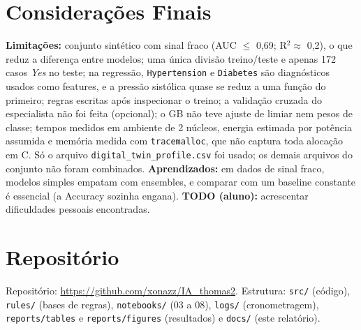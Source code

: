 \documentclass[11pt,a4paper]{article}
\begin{document}
\section{Considerações Finais}
\textbf{Limitações:} conjunto sintético com sinal fraco (AUC $\le$ 0,69; R$^2\approx$ 0,2), o que reduz a diferença entre modelos; uma única divisão treino/teste e apenas 172 casos \emph{Yes} no teste; na regressão, \texttt{Hypertension} e \texttt{Diabetes} são diagnósticos usados como features, e a pressão sistólica quase se reduz a uma função do primeiro;
regras escritas após inspecionar o treino; a validação cruzada do especialista não foi feita (opcional); o GB não teve ajuste de limiar nem pesos de classe; tempos medidos em ambiente de 2 núcleos, energia estimada por potência assumida e memória medida com \texttt{tracemalloc}, que não captura toda alocação em C.
Só o arquivo \texttt{digital\_twin\_profile.csv} foi usado; os demais arquivos do conjunto não foram combinados.
\textbf{Aprendizados:} em dados de sinal fraco, modelos simples empatam com ensembles, e comparar com um baseline constante é essencial (a Accuracy sozinha engana).
\textbf{TODO (aluno):} acrescentar dificuldades pessoais encontradas.

\section{Repositório}
Repositório: \url{https://github.com/xonazz/IA\_thomas2}. Estrutura: \texttt{src/} (código), \texttt{rules/} (bases de regras), \texttt{notebooks/} (03 a 08), \texttt{logs/} (cronometragem),
\texttt{reports/tables} e \texttt{reports/figures} (resultados) e \texttt{docs/} (este relatório).
\end{document}
